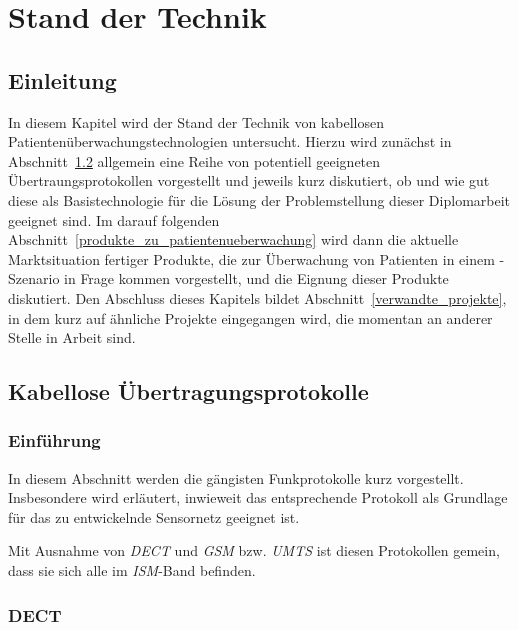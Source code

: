 
\chapter{Stand der Technik}\label{Stand der Technik}

\section{Einleitung}
In diesem Kapitel wird der Stand der Technik von kabellosen Patientenüberwachungstechnologien untersucht. 
Hierzu wird zunächst in Abschnitt~\ref{kabellose_uebertragungsprotokolle} allgemein eine Reihe von potentiell
geeigneten Übertraungsprotokollen vorgestellt und jeweils kurz diskutiert, ob und wie gut diese als 
Basistechnologie für die Lösung der Problemstellung dieser Diplomarbeit geeignet sind. Im darauf folgenden
Abschnitt~\ref{produkte_zu_patientenueberwachung} wird dann die aktuelle Marktsituation fertiger Produkte,
die zur Überwachung von Patienten in einem -Szenario in Frage kommen vorgestellt, und die Eignung dieser
Produkte diskutiert. Den Abschluss dieses Kapitels bildet Abschnitt~\ref{verwandte_projekte}, in dem
kurz auf ähnliche Projekte eingegangen wird, die momentan an anderer Stelle in Arbeit sind.

\section{Kabellose Übertragungsprotokolle}\label{kabellose_uebertragungsprotokolle}
    \subsection{Einführung}
        In diesem Abschnitt werden die gängisten Funkprotokolle kurz vorgestellt. Insbesondere wird erläutert,
        inwieweit das entsprechende Protokoll als Grundlage für das zu entwickelnde Sensornetz geeignet ist.

        Mit Ausnahme von \emph{DECT} und \emph{GSM} bzw. \emph{UMTS} ist diesen Protokollen gemein, dass 
        sie sich alle im \emph{ISM}-Band befinden. 

    \subsection{DECT}

